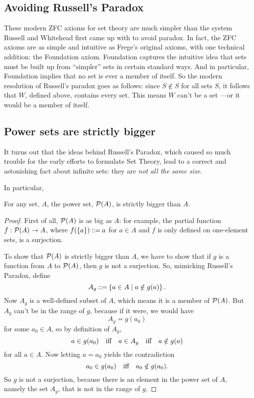 \subsection{Avoiding Russell's Paradox}

These modern ZFC axioms for set theory are much simpler than the system
Russell and Whitehead first came up with to avoid paradox.  In fact, the
ZFC axioms are as simple and intuitive as Frege's original axioms, with
one technical addition: the Foundation axiom.  Foundation captures the
intuitive idea that sets must be built up from ``simpler'' sets in certain
standard ways.  And in particular, Foundation implies that no set is ever
a member of itself.  So the modern resolution of Russell's paradox goes as
follows: since $S \not \in S$ for all sets $S$, it follows that $W$,
defined above, contains every set.  This means $W$ can't be a set ---or it
would be a member of itself.

\subsection{Power sets are strictly bigger}

It turns out that the ideas behind Russell's Paradox, which caused so much
trouble for the early efforts to formulate Set Theory, lead to a correct
and astonishing fact about infinite sets: they are \emph{not all the same
  size}.

In particular,
\begin{theorem}\label{powbig}
For any set, $A$, the power set, $\mathcal{P}(A)$, is strictly bigger than $A$.
\end{theorem}
\begin{proof}
  First of all, $\mathcal{P}(A)$ is as big as $A$: for example, the partial
  function $f:\mathcal{P}(A) \to A$, where $f(\left\{a\right\}) \mathbin{::=} a$ for $a \in A$
  and $f$ is only defined on one-element sets, is a surjection.

  To show that $\mathcal{P}(A)$ is strictly bigger than $A$, we have to show
  that if $g$ is a function from $A$ to $\mathcal{P}(A)$, then $g$ is not a
  surjection.  So, mimicking Russell's Paradox, define
  \[
  A_g \mathbin{::=} \left\{a \in A \mid a \notin g(a)\right\}.
  \]
  Now $A_g$ is a well-defined subset of $A$, which means it is a member of
  $\mathcal{P}(A)$.  But $A_g$ can't be in the range of $g$, because if it
  were, we would have
\[
A_g = g(a_0)
\]
for some $a_0 \in A$, so by definition of $A_g$,
\[
a \in g(a_0) \quad \text{iff} \quad a \in A_g \quad \text{iff} \quad a \notin g(a)
\]
for all $a \in A$.  Now letting $a = a_0$ yields the contradiction
\[
a_0 \in g(a_0) \quad \text{iff} \quad a_0 \notin g(a_0).
\]
So $g$ is not a surjection, because there is an element in the power set
of $A$, namely the set $A_g$, that is not in the range of $g$.
\end{proof}

